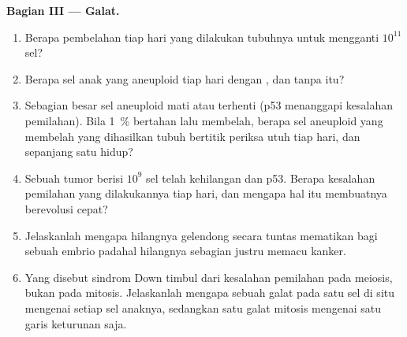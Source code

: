 \begin{problem}
\medskip
\noindent\textbf{Bagian III --- Galat.}
\begin{enumerate}[resume]
  \item Berapa pembelahan tiap hari yang dilakukan tubuhnya untuk mengganti
        $10^{11}$ sel?
  \item Berapa sel anak yang aneuploid tiap hari dengan , dan
        tanpa  itu?
  \item Sebagian besar sel aneuploid mati atau terhenti (p53 menanggapi
        kesalahan pemilahan). Bila \qty{1}{\%} bertahan lalu membelah, berapa
        sel aneuploid yang membelah yang dihasilkan tubuh bertitik periksa
        utuh tiap hari, dan sepanjang satu hidup?
  \item Sebuah tumor berisi $10^{9}$ sel telah kehilangan 
        dan p53. Berapa kesalahan pemilahan yang dilakukannya tiap hari, dan
        mengapa hal itu membuatnya berevolusi cepat?
  \item Jelaskanlah mengapa hilangnya  gelendong secara tuntas
        mematikan bagi sebuah embrio padahal hilangnya sebagian justru
        memacu kanker.
  \item Yang disebut sindrom Down timbul dari kesalahan pemilahan pada
        meiosis, bukan pada mitosis. Jelaskanlah mengapa sebuah galat pada satu sel di situ
        mengenai setiap sel anaknya, sedangkan satu galat mitosis mengenai
        satu garis keturunan saja.
\end{enumerate}


\end{problem}
